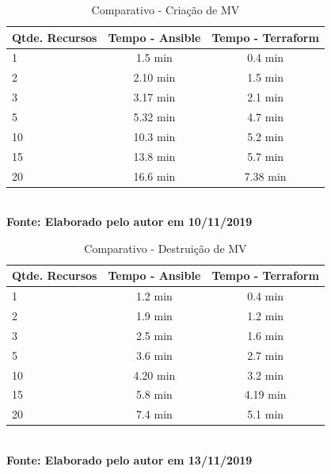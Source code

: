 \begin{table}[H]
	\centering
	\caption{\hspace{0.1cm} Comparativo - Criação de MV}
	\vspace{-0.3cm} %
	\label{tab:tabela3}
	\begin{tabular}{l|c|c}
  \hline
    \textbf{Qtde. Recursos}	& \textbf{Tempo - Ansible} & \textbf{Tempo - Terraform} \\
    \hline
  1   & 1.5 min   & 0.4  min    \\
2   & 2.10  min   & 1.5  min    \\
3   & 3.17  min   & 2.1  min    \\
5   & 5.32  min   & 4.7  min     \\
10  & 10.3  min   & 5.2  min      \\
15  & 13.8  min   & 5.7  min      \\
20  & 16.6  min   & 7.38 min      \\

     \hline
 \end{tabular}
 	\vspace{.1cm}  %
	\small
	{\footnotesize\\ \textbf{Fonte:  Elaborado pelo autor em 10/11/2019}}
\end{table}


\begin{table}[H]
	\centering
	\caption{\hspace{0.1cm} Comparativo - Destruição de MV}
	\vspace{-0.3cm} %
	\label{tab:tabela4}
	\begin{tabular}{l|c|c}
  \hline
    \textbf{Qtde. Recursos}	& \textbf{Tempo - Ansible} & \textbf{Tempo - Terraform} \\
    \hline
  1   & 1.2  min   & 0.4  min    \\
2   & 1.9    min   & 1.2  min    \\
3   & 2.5    min   & 1.6  min    \\
5   & 3.6    min   & 2.7  min     \\
10  & 4.20   min   & 3.2  min      \\
15  & 5.8    min   & 4.19 min      \\
20  & 7.4    min   & 5.1  min      \\

     \hline
 \end{tabular}
 	\vspace{.1cm}  %
	\small
	{\footnotesize\\ \textbf{Fonte: Elaborado pelo autor em 13/11/2019}}
\end{table}


